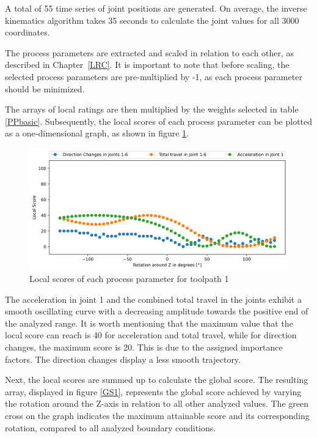 A total of 55 time series of joint positions are generated. On average, the inverse kinematics algorithm takes 35 seconds to calculate the joint values for all 3000 coordinates.

The process parameters are extracted and scaled in relation to each other, as described in Chapter~\ref{LRC}. It is important to note that before scaling, the selected process parameters are pre-multiplied by -1, as each process parameter should be minimized.

The arrays of local ratings are then multiplied by the weights selected in table \ref{PPbasic}.
Subsequently, the local scores of each process parameter can be plotted as a one-dimensional graph, as shown in figure \ref{LS1}. %



\begin{figure}[H]
	\centerline{\includegraphics[width=1\textwidth]{figures/LocalScores_1.png}}
	\caption{Local scores of each process parameter for toolpath 1}
	\label{LS1}
\end{figure}

The acceleration in joint 1 and the combined total travel in the joints exhibit a smooth oscillating curve with a decreasing amplitude towards the positive end of the analyzed range. It is worth mentioning that the maximum value that the local score can reach is 40 for acceleration and total travel, while for direction changes, the maximum score is 20. This is due to the assigned importance factors. The direction changes display a less smooth trajectory.

Next, the local scores are summed up to calculate the global score. The resulting array, displayed in figure \ref{GS1}, represents the global score achieved by varying the rotation around the Z-axis in relation to all other analyzed values. The green cross on the graph indicates the maximum attainable score and its corresponding rotation, compared to all analyzed boundary conditions.

